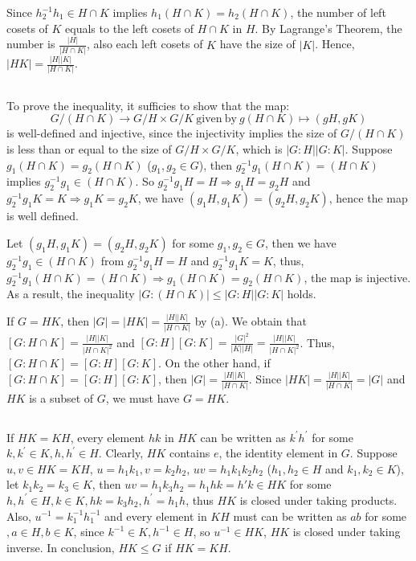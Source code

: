 \documentclass[12pt]{article}
\begin{document}
Since $h_2^{-1}h_1\in H\cap K$ implies $h_1(H\cap K)=h_2(H\cap K)$, the number of left cosets of $K$ equals to the left cosets of $H\cap K$ in $H$. By Lagrange's Theorem, the number is $\frac{|H|}{|H\cap K|}$, also each left cosets of $K$ have the size of $|K|$. Hence, $|HK|=\frac{|H||K|}{|H\cap K|}$.
\subsection{}
To prove the inequality, it sufficies to show that the map:
$$G/(H\cap K)\rightarrow G/H\times G/K\mathrm{\ given\ by\ }g(H\cap K)\mapsto (gH,gK)$$
is well-defined and injective, since the injectivity implies the size of $G/(H\cap K)$ is less than or equal to the size of $G/H\times G/K$, which is $|G:H||G:K|$. Suppose $g_1(H\cap K)=g_2(H\cap K)$ ($g_1,g_2\in G$), then $g_2^{-1}g_1(H\cap K)=(H\cap K)$ implies $g_2^{-1}g_1\in(H\cap K)$. So $g_2^{-1}g_1H=H\Rightarrow g_1H=g_2H$ and $g_2^{-1}g_1K=K\Rightarrow g_1K=g_2K$, we have $(g_1H, g_1K)=(g_2H,g_2K)$, hence the map is well defined.

Let $(g_1H, g_1K)=(g_2H,g_2K)$ for some $g_1,g_2\in G$, then we have $g_2^{-1}g_1\in (H\cap K)$ from $g_2^{-1}g_1H=H$ and $g_2^{-1}g_1K=K$, thus, $g_2^{-1}g_1(H\cap K)=(H\cap K)\Rightarrow g_1(H\cap K)=g_2(H\cap K)$, the map is injective. As a result, the inequality $|G:(H\cap K)|\le |G:H||G:K|$ holds.

If $G=HK$, then $|G|=|HK|=\frac{|H||K|}{|H\cap K|}$ by (a). We obtain that $[G:H\cap K]=\frac{|H||K|}{|H\cap K|^2}$ and $[G:H][G:K]=\frac{|G|^2}{|K||H|}=\frac{|H||K|}{|H\cap K|^2}$. Thus, $[G:H\cap K]=[G:H][G:K]$. On the other hand, if $[G:H\cap K]=[G:H][G:K]$, then $|G|=\frac{|H||K|}{|H\cap K|}$. Since $|HK|=\frac{|H||K|}{|H\cap K|}=|G|$ and $HK$ is a subset of $G$, we must have $G=HK$.
\subsection{}

If $HK=KH$, every element $hk$ in $HK$ can be written as $k^{'}h^{'}$ for some $k,k^{'}\in K,h,h^{'}\in H$. Clearly, $HK$ contains $e$, the identity element in $G$. Suppose $u,v\in HK=KH$, $u=h_1k_1, v=k_2h_2$, $uv=h_1k_1k_2h_2$ ($h_1,h_2\in H$ and $k_1,k_2\in K$), let $k_1k_2=k_3\in K$, then $uv=h_1k_3h_2=h_1hk=h'k\in HK$ for some $h,h^{'}\in H, k\in K,hk=k_3h_2, h^{'}=h_1h$, thus $HK$ is closed under taking products. Also, $u^{-1}=k_1^{-1}h_1^{-1}$ and every element in $KH$ must can be written as $ab$ for some $,a\in H,b\in K$, since $k^{-1}\in K,h^{-1}\in H$, so $u^{-1}\in HK$, $HK$ is closed under taking inverse. In conclusion, $HK\le G$ if $HK=KH$.
\end{document}
